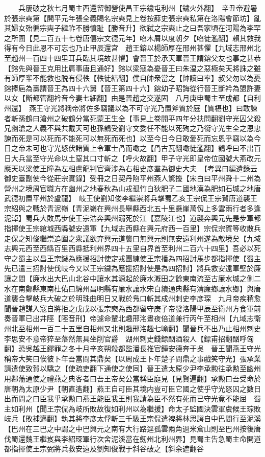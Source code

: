 　　兵屢破之秋七月蜀主西還留御營使昌王宗鐬屯利州【鐬火外翻】　辛丑帝避暑於張宗奭第【開平元年張全義賜名宗奭見上卷按薛史張宗奭私第在洛陽會節坊】亂其婦女殆徧宗奭子繼祚不勝憤耻【勝音升】欲弑之宗奭止之曰吾家頃在河陽為李罕之所圍【見二百五十七卷唐僖宗文德元年】啗木屑以度朝夕【啗徒濫翻】賴其救我得有今日此恩不可忘也乃止甲辰還宫　趙王鎔以楊師厚在邢州甚懼【九域志邢州北至趙州一百四十四里耳兵臨其境故甚懼】會晉王於承天軍晉王謂鎔父友也事之甚恭【鎔先與晉王克用比肩事唐且通好】鎔以梁寇為憂晉王曰朱温之惡極矣天將誅之雖有師厚輩不能救也脱有侵軼【軼徒結翻】僕自帥衆當之【帥讀曰率】叔父勿以為憂鎔捧巵為壽謂晉王為四十六舅【晉王第四十六】鎔幼子昭誨從行晉王斷衿為盟許妻以女【斷都管翻衿音今妻七細翻】由是晉趙之交遂固　八月庚申蜀主至成都【自利州還】　燕王守光將稱帝將佐多竊議以為不可守光乃置斧質於庭【質椹也】曰敢諫者斬孫鶴曰滄州之破鶴分當死蒙王生全【事見上卷開平四年分扶問翻劉守光囚父殺兄幽滄之人義不與共戴天可也孫鶴受劉守文委任不能以死殉之乃銜守光生全之恩忠諫而死是可以死而不能死可以無死而死也】以至今日今日敢愛死而忘恩乎竊以為今日之帝未可也守光怒伏諸質上令軍士冎而噉之【冎古瓦翻噉徒濫翻】鶴呼曰不出百日大兵當至守光命以土窒其口寸斬之【呼火故翻】甲子守光即皇帝位國號大燕改元應天以梁使王瞳為左相盧龍判官齊涉為右相史彦羣為御史大夫　【考異曰編遺錄云御史臺副使今從莊宗實錄】受冊之日契丹陷平州燕人驚擾【宋白曰平州舜十二州為營州之境周官職方在幽州之地春秋為山戎孤竹白狄肥子二國地漢為肥如石城之地唐武德初置平州於盧龍】　岐王使劉知俊李繼崇將兵擊蜀乙亥王宗侃王宗賀唐道襲王宗紹與之戰於青泥嶺【青泥嶺在興州長舉縣西北五十里懸崖萬仭上多雲雨行者多逢泥淖】蜀兵大敗馬步使王宗浩奔興州溺死於江【嘉陵江也】道襲奔興元先是步軍都指揮使王宗綰城西縣號安遠軍【九域志西縣在興元府西一百里】宗侃宗賀等收散兵走保之知俊繼崇追圍之衆議欲弃興元道襲曰無興元則無安遠利州遂為敵境矣【九域志興元西至西縣百里西縣抵利州界四十五里自界首至利州二百六十四里】吾必以死守之蜀主以昌王宗鐬為應援招討使定戎團練使王宗播為四招討馬步都指揮使【蜀主先已遣三招討使伐岐今又以王宗鐬為應援招討使是為四招討】將兵救安遠軍壁於廉讓之間【廉水出大巴山北谷中讓水其源起於廉水漑田之餘東南流至古廉水城之側二水在南鄭縣東南杜佑曰綿州昌明縣有廉水讓水宋白續通典縣有清廉鄉讓水鄉】與唐道襲合擊岐兵大破之於明珠曲明日又戰於鳬口斬其成州刺史李彦琛　九月帝疾稍愈聞晉趙謀入寇自將拒之戊戌以張宗奭為西都留守庚子帝發洛陽甲辰至衛州方食軍前奏晉軍已出井陘【陘音刑】帝遽命輦北趣邢洺晝夜倍道兼行丙午至相州【九域志衛州北至相州一百二十五里自相州又北則趣邢洺趣七喻翻】聞晉兵不出乃止相州刺史李思安不意帝猝至落然無具坐削官爵　湖州刺史錢鏢酗酒殺人【鏢甫招翻酗呼匈翻】恐吳越王鏐罪之冬十月辛亥朔殺都監潘長推官鍾安德奔于吳　晉王聞燕王守光稱帝大笑曰俟彼卜年吾當問其鼎矣【以周成王卜年楚子問鼎之事戲笑守光】張承業請遣使致賀以驕之【使疏吏翻下通使之使同】晉王遣太原少尹李承勲往承勲至幽州用鄰藩通使之禮燕之典客者曰吾王帝矣公當稱臣庭見【見賢遍翻】承勲曰吾受命於唐朝為太原少尹【朝直遙翻】燕王自可臣其境内豈可臣它國之使乎守光怒囚之數日出而問之曰臣我乎承勲曰燕王能臣我王則我請為臣不然有死而已守光竟不能屈　蜀主如利州【聞王宗侃為岐所敗故復如利州以為繼援】命太子監國決雲軍虞候王琮敗岐兵【敗補邁翻】執其將李彦太俘斬三千級王宗侃遣裨將林思諤自中巴間行至泥溪【巴州在三巴之中謂之中巴興元之南有大行路逕孤雲兩角過米倉山則至巴州按後唐伐蜀還魏王繼岌與李紹琛軍行次舍泥溪當在劒州北利州界】見蜀主告急蜀主命開道都指揮使王宗弼將兵救安遠及劉知俊戰于斜谷破之【斜余遮翻谷
